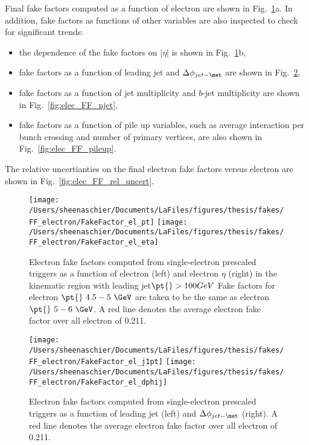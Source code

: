 \documentclass[11pt, oneside]{article}   	%
\begin{document}
Final fake factors computed as a function of electron \pt{} are shown in Fig.~\ref{fig:elec_FF_hist}a.  In addition, fake factors as functions of other variables are also inspected to check for significant trends:
\begin{itemize}
\item the dependence of the fake factors on $|\eta|$ is shown in Fig.~\ref{fig:elec_FF_hist}b,
\item fake factors as a function of leading jet \pt{} and  $\Delta\phi_{jet-\met}$ are shown in Fig.~\ref{fig:elec_FF_hadronic},
\item fake factors as a function of jet multiplicity and $b$-jet multiplicity are shown in Fig.~\ref{fig:elec_FF_njet},
\item fake factors as a function of pile up variables, such as average interaction per bunch crossing and number of primary vertices, are also shown in Fig.~\ref{fig:elec_FF_pileup}.
\end{itemize}
The relative uncertianties on the final electron fake factors versus electron \pt{} are shown in Fig.~\ref{fig:elec_FF_rel_uncert}.

\begin{figure}[tbp]
  \centering
  \texttt{[image: /Users/sheenaschier/Documents/LaFiles/figures/thesis/fakes/FF\_electron/FakeFactor\_el\_pt]}
  \texttt{[image: /Users/sheenaschier/Documents/LaFiles/figures/thesis/fakes/FF\_electron/FakeFactor\_el\_eta]}
  \caption{Electron fake factors computed from single-electron prescaled triggers as a function of electron \pt{} (left) and electron $\eta$ (right) in the kinematic region with leading jet$ \pt{}>100GeV$  Fake factors for electron $\pt{}~ 4.5-5~\GeV$ are taken to be the same as electron $\pt{}~5-6~\GeV$.  A red line denotes the average electron fake factor over all electron \pt{} of 0.211. }
  \label{fig:elec_FF_hist}
\end{figure}

\begin{figure}[tbp]
  \centering
  \texttt{[image: /Users/sheenaschier/Documents/LaFiles/figures/thesis/fakes/FF\_electron/FakeFactor\_el\_j1pt]}
  \texttt{[image: /Users/sheenaschier/Documents/LaFiles/figures/thesis/fakes/FF\_electron/FakeFactor\_el\_dphij]}\\
  \caption{Electron fake factors computed from single-electron prescaled triggers as a function of leading jet \pt{} (left) and $\Delta\phi_{jet-\met}$ (right). A red line denotes the average electron fake factor over all electron \pt{} of 0.211.}
  \label{fig:elec_FF_hadronic}
\end{figure}
\end{document}
